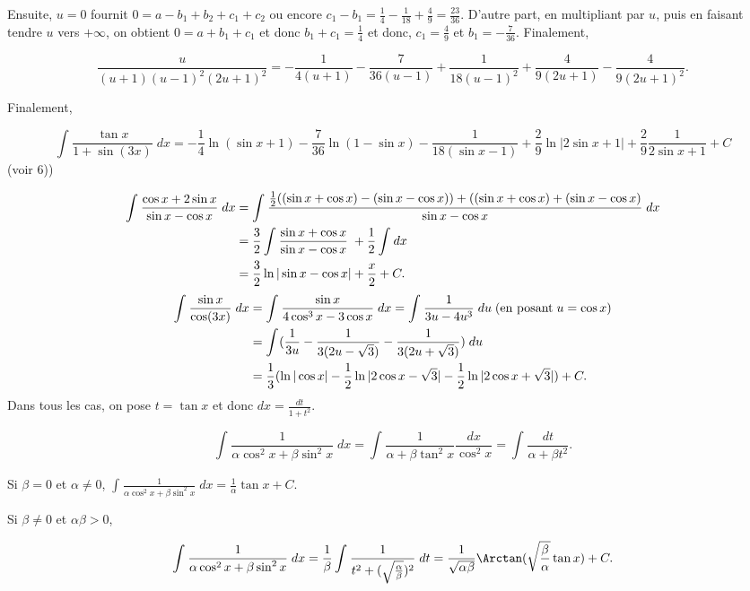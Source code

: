 {{Ensuite, $u=0$ fournit $0=a-b_1+b_2+c_1+c_2$ ou encore $c_1-b_1=\frac{1}{4}-\frac{1}{18}+\frac{4}{9}=\frac{23}{36}$. D'autre part, en multipliant par $u$, puis en faisant tendre $u$ vers $+\infty$, on obtient $0=a+b_1+c_1$ et donc $b_1+c_1=\frac{1}{4}$ et donc, $c_1=\frac{4}{9}$ et $b_1=-\frac{7}{36}$. Finalement,

$$\frac{u}{(u+1)(u-1)^2(2u+1)^2}=-\frac{1}{4(u+1)}-\frac{7}{36(u-1)}+\frac{1}{18(u-1)^2}+\frac{4}{9(2u+1)}-\frac{4}{9(2u+1)^2}.$$

Finalement,

$$\int_{}^{}\frac{\tan x}{1+\sin(3x)}\;dx=-\frac{1}{4}\ln(\sin x+1)-\frac{7}{36}\ln(1-\sin x)-\frac{1}{18(\sin x-1)}+\frac{2}{9}\ln|2\sin x+1|+\frac{2}{9}\frac{1}{2\sin x+1}+C$$
(voir 6)) 

\begin{align*}\ensuremath
\int_{}^{}\frac{\cos x+2\sin x}{\sin x-\cos x}\;dx&=\int_{}^{}\frac{\frac{1}{2}((\sin x+\cos x)-(\sin x-\cos x))+((\sin x+\cos x)+(\sin x-\cos x)}{\sin x-\cos x}\;dx\\
 &=\frac{3}{2}\int_{}^{}\frac{\sin x+\cos x}{\sin x-\cos x}\;+\frac{1}{2}\int_{}^{}dx\\
 &=\frac{3}{2}\ln|\sin x-\cos x|+\frac{x}{2}+C.
\end{align*}
\begin{align*}\ensuremath
\int_{}^{}\frac{\sin x}{\cos(3x)}\;dx&=\int_{}^{}\frac{\sin x}{4\cos^3x-3\cos x}\;dx
=\int_{}^{}\frac{1}{3u-4u^3}\;du\;(\mbox{en posant}\;u=\cos x)\\
 &=\int_{}^{}(\frac{1}{3u}-\frac{1}{3(2u-\sqrt{3})}-\frac{1}{3(2u+\sqrt{3})})\;du\\
 &=\frac{1}{3}(\ln|\cos x|-\frac{1}{2}\ln|2\cos x-\sqrt{3}|-\frac{1}{2}\ln|2\cos x+\sqrt{3}|)+C.
\end{align*}
Dans tous les cas, on pose $t=\tan x$ et donc $dx=\frac{dt}{1+t^2}$.

$$\int_{}^{}\frac{1}{\alpha\cos^2x+\beta\sin^2 x}\;dx=\int_{}^{}\frac{1}{\alpha+\beta\tan^2x}\frac{dx}{\cos^2x}=\int_{}^{}\frac{dt}{\alpha+\beta t^2}.$$

Si $\beta=0$ et $\alpha\neq0$, $\int_{}^{}\frac{1}{\alpha\cos^2x+\beta\sin^2x}\;dx=\frac{1}{\alpha}\tan x+C$.

Si $\beta\neq0$ et $\alpha\beta>0$, 

$$\int_{}^{}\frac{1}{\alpha\cos^2x+\beta\sin^2 x}\;dx=\frac{1}{\beta}\int_{}^{}\frac{1}{t^2+(\sqrt{\frac{\alpha}{\beta}})^2}\;dt=\frac{1}{\sqrt{\alpha\beta}}\Arctan(\sqrt{\frac{\beta}{\alpha}}\tan x)+C.$$

}}
